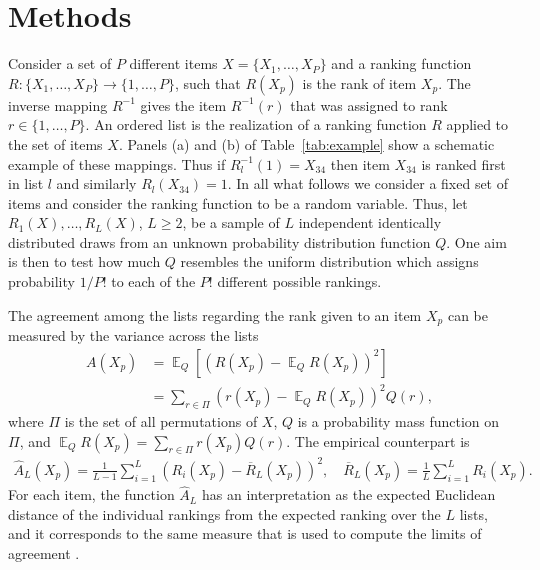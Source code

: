 \documentclass[oupdraft]{bio}
\newcommand{\nn}{\nonumber}
\DeclareMathOperator{\E}{\mathbb{E}}
\begin{document}
\section{Methods}

Consider a set of $P$ different items $X=\{X_1,\dots,X_P\}$ and a
ranking function $R: \{X_1,\dots,X_P\}\to \{1,\dots,P\}$, such that
$R(X_p)$ is the rank of item $X_p$. The inverse mapping $R^{-1}$ gives
the item $R^{-1}(r)$ that was assigned to rank $r\in\{1,\dots,P\}$. An
ordered list is the realization of a ranking function $R$ applied to
the set of items $X$.  Panels (a) and (b) of Table~\ref{tab:example}
show a schematic example of these mappings. Thus if
$R_l^{-1}(1)=X_{34}$ then item $X_{34}$ is ranked first in list $l$
and similarly $R_l(X_{34})=1$.
% 
In all what follows we consider a fixed set of items and consider the
ranking function to be a random variable. Thus, let
$R_1(X),\dots,R_L(X)$, $L\geq2$, be a sample of $L$ independent
identically distributed draws from an unknown probability distribution
function $Q$. One aim is then to test how much $Q$ resembles the
uniform distribution which assigns probability $1/P!$ to each of the
$P!$ different possible rankings. 


The agreement among the lists regarding the rank given to an item $X_p$
can be measured by the variance across the lists
\begin{align}
  A(X_p) &= \E_Q\left[\left(R(X_p)-\E_Q R(X_p)\right)^2\right]\\
   &= \sum_{r\in\Pi} \left(r(X_p)-\E_Q R(X_p)\right)^2 Q(r),\nn
\end{align}
where $\Pi$ is the set of all permutations of $X$, $Q$ is a
probability mass function on $\Pi$, and
$\E_Q R(X_p)=\sum_{r\in\Pi} r(X_p)Q(r)$. The empirical counterpart is
\begin{align}
\widehat{A}_L(X_p) = \frac{1}{L-1}\sum_{i=1}^L (R_i(X_p) - \overline{R}_L(X_p))^2, \quad \overline{R}_L(X_p) = \frac{1}{L}\sum_{i=1}^L R_i(X_p).\label{eq:empDistance}
\end{align}
For each item, the function $\widehat{A}_L$ has an interpretation as the expected
Euclidean distance of the individual rankings from the expected
ranking over the $L$ lists, and it corresponds to the same measure
that is used to compute the limits of
agreement \citep{alt:bland:1983}.
\end{document}
